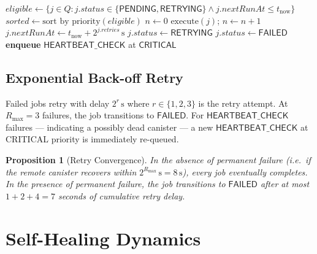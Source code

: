 \documentclass[12pt]{article}
\newtheorem{proposition}[theorem]{Proposition}
\begin{document}
\begin{algorithm}[h]
  \caption{Solver tick scheduler}
  \label{alg:tick}
  \begin{algorithmic}[1]
    \State $\mathit{eligible} \gets \{j \in Q : j.\mathit{status} \in \{\mathsf{PENDING}, \mathsf{RETRYING}\}
                   \wedge j.\mathit{nextRunAt} \le t_\text{now}\}$
    \State $\mathit{sorted} \gets \text{sort by priority}(\mathit{eligible})$
    \State $n \gets 0$
        \State $\text{execute}(j)$; $n \gets n + 1$
          \State $j.\mathit{nextRunAt} \gets t_\text{now} + 2^{j.\mathit{retries}}\,\text{s}$
          \State $j.\mathit{status} \gets \mathsf{RETRYING}$
          \State $j.\mathit{status} \gets \mathsf{FAILED}$
            \State \textbf{enqueue} $\mathsf{HEARTBEAT\_CHECK}$ at $\mathsf{CRITICAL}$
          \EndIf
        \EndIf
      \EndIf
    \EndFor
  \end{algorithmic}
\end{algorithm}

\subsection{Exponential Back-off Retry}
\label{subsec:retry}

Failed jobs retry with delay $2^{r}\,\text{s}$ where $r \in \{1, 2, 3\}$ is
the retry attempt.  At $R_\text{max} = 3$ failures, the job transitions to
$\mathsf{FAILED}$.  For $\mathsf{HEARTBEAT\_CHECK}$ failures — indicating a
possibly dead canister — a new $\mathsf{HEARTBEAT\_CHECK}$ at CRITICAL priority
is immediately re-queued.

\begin{proposition}[Retry Convergence]
  In the absence of permanent failure (i.e.\ if the remote canister recovers
  within $2^{R_\text{max}}\,\text{s} = 8\,\text{s}$), every job eventually
  completes.  In the presence of permanent failure, the job transitions to
  $\mathsf{FAILED}$ after at most $1 + 2 + 4 = 7$ seconds of cumulative retry
  delay.
\end{proposition}

\section{Self-Healing Dynamics}
\label{sec:selfhealing}
\end{document}
